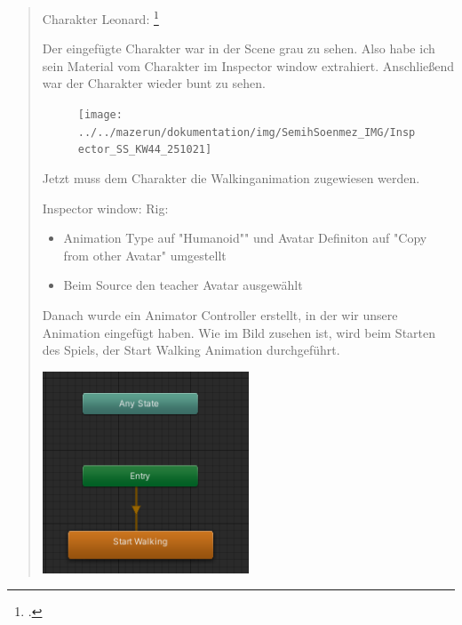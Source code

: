 \begin{quote}
	Charakter Leonard: \footcite{LehrerCharakter}
	
	Der eingefügte Charakter war in der Scene grau zu sehen. Also habe ich
	sein Material vom Charakter im Inspector window extrahiert. Anschließend
	war der Charakter wieder bunt zu sehen.

	\begin{figure}
		\centering
		\texttt{[image: ../../mazerun/dokumentation/img/SemihSoenmez\_IMG/Inspector\_SS\_KW44\_251021]}
		\caption{}
		\label{fig:inspectorsskw44251021}
	\end{figure}

	
	Jetzt muss dem Charakter die Walkinganimation zugewiesen werden.
	
	Inspector window: Rig:
	
	\begin{itemize}
		\item
		Animation Type auf "Humanoid"" und Avatar Definiton auf "Copy from
		other Avatar" umgestellt
		\item
		Beim Source den teacher Avatar ausgewählt
	\end{itemize}
	
	Danach wurde ein Animator Controller erstellt, in der wir unsere
	Animation eingefügt haben. Wie im Bild zusehen ist, wird beim Starten
	des Spiels, der Start Walking Animation durchgeführt.
	\begin{center}
		\includegraphics[frame, height=6cm]{img/SemihSoenmez_IMG/StateMachine_SS_KW44_251021.png}
	\end{center}
\end{quote}

